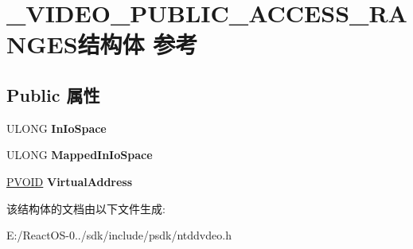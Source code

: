 \hypertarget{struct___v_i_d_e_o___p_u_b_l_i_c___a_c_c_e_s_s___r_a_n_g_e_s}{}\section{\+\_\+\+V\+I\+D\+E\+O\+\_\+\+P\+U\+B\+L\+I\+C\+\_\+\+A\+C\+C\+E\+S\+S\+\_\+\+R\+A\+N\+G\+E\+S结构体 参考}
\label{struct___v_i_d_e_o___p_u_b_l_i_c___a_c_c_e_s_s___r_a_n_g_e_s}
\subsection*{Public 属性}
\begin{DoxyCompactItemize}
\item 
\mbox{\label{struct___v_i_d_e_o___p_u_b_l_i_c___a_c_c_e_s_s___r_a_n_g_e_s_adaf9e63f5959f9a690d7aef37c72bb77}} 
U\+L\+O\+NG {\bfseries In\+Io\+Space}
\item 
\mbox{\label{struct___v_i_d_e_o___p_u_b_l_i_c___a_c_c_e_s_s___r_a_n_g_e_s_af7057ac284d5add18450409a6a30f764}} 
U\+L\+O\+NG {\bfseries Mapped\+In\+Io\+Space}
\item 
\mbox{\label{struct___v_i_d_e_o___p_u_b_l_i_c___a_c_c_e_s_s___r_a_n_g_e_s_a7680512304479995e18aad68746f1e14}} 
\hyperlink{interfacevoid}{P\+V\+O\+ID} {\bfseries Virtual\+Address}
\end{DoxyCompactItemize}


该结构体的文档由以下文件生成\+:\begin{DoxyCompactItemize}
\item 
E\+:/\+React\+O\+S-\/0../sdk/include/psdk/ntddvdeo.\+h\end{DoxyCompactItemize}
